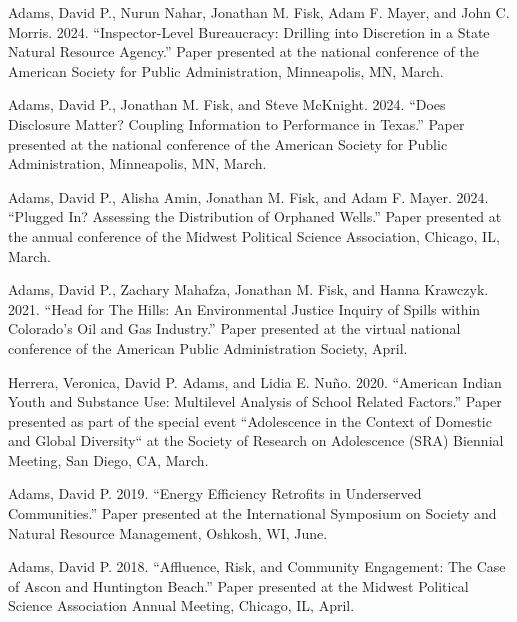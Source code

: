 \documentclass[12pt,letterpaper]{article}
\renewenvironment{itemize}{
  \begin{list}{}{
    \setlength{\leftmargin}{1.5em}
    \setlength{\itemsep}{0.25em}
    \setlength{\parskip}{0pt}
    \setlength{\parsep}{0.25em}
  }
}{
  \end{list}
}
\begin{document}
	\begin{itemize}\leftmargin=2pt\itemindent=-15pt\leftmargin=2pt\itemindent=-15pt

      \item Adams, David P., Nurun Nahar, Jonathan M. Fisk, Adam F. Mayer, and John C. Morris. 2024. ``Inspector-Level Bureaucracy: Drilling into Discretion in a State Natural Resource Agency.'' Paper presented at the national conference of the American Society for Public Administration, Minneapolis, MN, March.
      
      \item Adams, David P., Jonathan M. Fisk, and Steve McKnight. 2024. ``Does Disclosure Matter? Coupling Information to Performance in Texas.'' Paper presented at the national conference of the American Society for Public Administration, Minneapolis, MN, March.
      
      \item Adams, David P., Alisha Amin, Jonathan M. Fisk, and Adam F. Mayer. 2024. ``Plugged In? Assessing the Distribution of Orphaned Wells.'' Paper presented at the annual conference of the Midwest Political Science Association, Chicago, IL, March.
      
      \item Adams, David P., Zachary Mahafza, Jonathan M. Fisk, and Hanna Krawczyk. 2021. ``Head for The Hills: An Environmental Justice Inquiry of Spills within Colorado's Oil and Gas Industry.'' Paper presented at the virtual national conference of the American Public Administration Society, April.
      
      \item Herrera, Veronica, David P. Adams, and Lidia E. Nuño. 2020. ``American Indian Youth and Substance Use: Multilevel Analysis of School Related Factors.'' Paper presented as part of the special event ``Adolescence in the Context of Domestic and Global Diversity`` at the Society of Research on Adolescence (SRA) Biennial Meeting, San Diego, CA, March.
      
      \item Adams, David P. 2019. ``Energy Efficiency Retrofits in Underserved Communities.'' Paper presented at the International Symposium on Society and Natural Resource Management, Oshkosh, WI, June.
      
      \item Adams, David P. 2018. ``Affluence, Risk, and Community Engagement: The Case of Ascon and Huntington Beach.'' Paper presented at the Midwest Political Science Association Annual Meeting, Chicago, IL, April.
      

\end{itemize}
\end{document}
